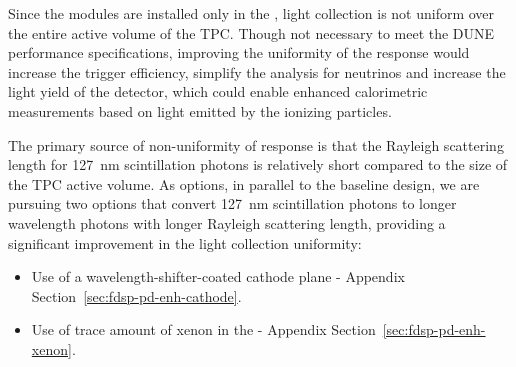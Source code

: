 

Since the  modules are installed only in the , light collection is not uniform over the entire active volume of the TPC. 
Though not necessary to meet the DUNE performance specifications, improving the uniformity of the response would increase the trigger efficiency, simplify the analysis for  neutrinos and increase the light yield of the detector, which could enable enhanced calorimetric measurements based on light emitted by the ionizing particles.

The primary source of non-uniformity of response is that the Rayleigh scattering length for \SI{127}{nm} scintillation photons is relatively short compared to the size of the TPC active volume.   
As options, in parallel to the baseline design, we are pursuing two options that convert \SI{127}{nm} scintillation photons to longer wavelength photons with longer Rayleigh scattering length, providing a significant improvement in the light collection uniformity:

\begin{itemize}
\item Use of a wavelength-shifter-coated cathode plane - Appendix Section~\ref{sec:fdsp-pd-enh-cathode}.
\item Use of trace amount of xenon in the  - Appendix Section~\ref{sec:fdsp-pd-enh-xenon}.
\end{itemize}



